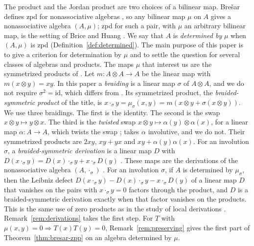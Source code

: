\documentclass[]{interact}
\theoremstyle{plain}
\theoremstyle{definition}
\theoremstyle{remark}
\begin{document}
The product and the Jordan product are two choices of a bilinear map.
Bre\v{s}ar defines zpd for nonassociative algebras \citep[Definition 1.1]{Bresar2021}, so any bilinear map $\mu$ on $A$ gives a nonassociative algebra $(A,\mu)$; zpd for such a pair, with $\mu$ an arbitrary bilinear map, is the setting of Brice and Huang \citep{BriceHuang2015}.
We say that $A$ is \emph{determined by} $\mu$ when $(A,\mu)$ is zpd (Definition~\ref{def:determined}).
The main purpose of this paper is to give a criterion for determination by $\mu$ and to settle the question for several classes of algebras and products.
The maps $\mu$ that interest us are the symmetrized products of \citet[Section 1]{Adrabi2026}.
Let $m \colon A \otimes A \to A$ be the linear map with $m(x \otimes y) = xy$.
In this paper a \emph{braiding} is a linear map $\sigma$ of $A \otimes A$, and we do not require $\sigma^2 = \mathrm{id}$, which differs from \citep[Definition 3.1]{Adrabi2026}.
Its symmetrized product, the \emph{braided-symmetric product} of the title, is $x \cdot_\sigma y = \mu_\sigma(x,y) = m(x \otimes y + \sigma(x \otimes y))$.
We use three braidings.
The first is the identity. %
The second is the swap $x \otimes y \mapsto y \otimes x$. %
The third is the \emph{twisted} swap $x \otimes y \mapsto \alpha(y) \otimes \alpha(x)$, for a linear map $\alpha \colon A \to A$, which twists the swap \citep[Section 4]{Adrabi2026}; \citet{Adrabi2026} takes $\alpha$ involutive, and we do not.
Their symmetrized products are $2xy$, $xy + yx$ and $xy + \alpha(y)\alpha(x)$. %
For an involution $\sigma$, a \emph{braided-symmetric derivation} is a linear map $D$ with $D(x \cdot_\sigma y) = D(x) \cdot_\sigma y + x \cdot_\sigma D(y)$ \citep[Definition 3.1]{Adrabi2026}.
These maps are the derivations of the nonassociative algebra $(A, \cdot_\sigma)$ \citep[Remark 3.4]{Adrabi2026}.
For an involution $\sigma$, if $A$ is determined by $\mu_\sigma$, then the Leibniz defect $D(x \cdot_\sigma y) - D(x) \cdot_\sigma y - x \cdot_\sigma D(y)$ of a linear map $D$ that vanishes on the pairs with $x \cdot_\sigma y = 0$ factors through the product, and $D$ is a braided-symmetric derivation exactly when that factor vanishes on the products.
This is the same use of zero products as in the study of local derivations \citep[Example 1.10]{Bresar2021}.
Remark~\ref{rem:derivations} takes the first step.
For $T$ with $\mu(x,y) = 0 \Rightarrow T(x)T(y) = 0$, Remark~\ref{rem:preserving} gives the first part of Theorem~\ref{thm:bresar-zpp} on an algebra determined by $\mu$.
\end{document}
